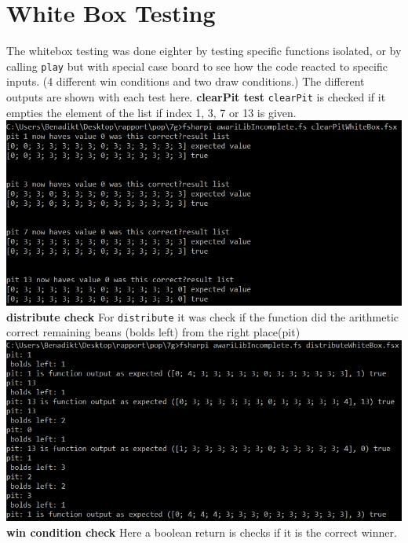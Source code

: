 \documentclass{article}
\begin{document}
    	\section{White Box Testing}
   		The whitebox testing was done eighter by testing specific functions isolated, or by calling \verb|play| but with special case board to see how the code reacted to specific inputs. (4 different win conditions and two draw conditions.) The different outputs are shown with each test here. 
   		\textbf{clearPit test}\newline
        \verb|clearPit| is checked if it empties the element of the list if index 1, 3, 7 or 13 is given.\\
        \includegraphics[scale=0.6]{clearPitWhieBox.png}
        \\
        \newpage
        \textbf{distribute check}\newline
        For \verb|distribute| it was check if the function did the arithmetic correct remaining beans (bolds left) from the right place(pit)
        \\
        \includegraphics[scale=0.59]{distributeWhiteBox.png}
        \\
        \textbf{win condition check}\newline
        Here a boolean return is checks if it is the correct winner. 
        \\
\end{document}
